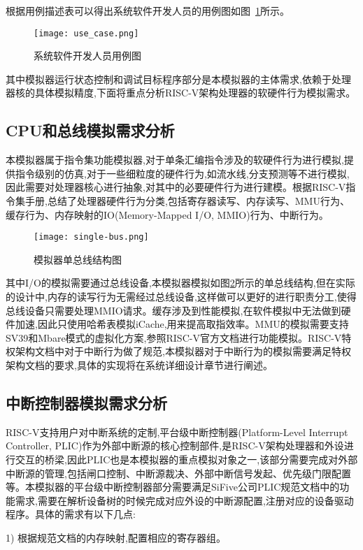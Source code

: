 根据用例描述表可以得出系统软件开发人员的用例图如图~\ref{fig:use-case}所示。
\begin{figure}[H]
  \centering
  \texttt{[image: use\_case.png]}
  \caption{系统软件开发人员用例图}
  \label{fig:use-case}
\end{figure}


其中模拟器运行状态控制和调试目标程序部分是本模拟器的主体需求,依赖于处理器核的具体模拟精度,下面将重点分析RISC-V架构处理器的软硬件行为模拟需求。

\subsection{CPU和总线模拟需求分析}
本模拟器属于指令集功能模拟器,对于单条汇编指令涉及的软硬件行为进行模拟,提供指令级别的仿真,对于一些细粒度的硬件行为,如流水线,分支预测等不进行模拟,因此需要对处理器核心进行抽象,对其中的必要硬件行为进行建模。根据RISC-V指令集手册,总结了处理器硬件行为分类,包括寄存器读写、内存读写、MMU行为、缓存行为、内存映射的IO(Memory-Mapped I/O, MMIO)行为、中断行为。
\begin{figure}[H]
  \centering
  \texttt{[image: single-bus.png]}
  \caption{模拟器单总线结构图}
  \label{fig:single-bus}
\end{figure}

其中I/O的模拟需要通过总线设备,本模拟器模拟如图\ref{fig:single-bus}所示的单总线结构,但在实际的设计中,内存的读写行为无需经过总线设备,这样做可以更好的进行职责分工,使得总线设备只需要处理MMIO请求。缓存涉及到性能模拟,在软件模拟中无法做到硬件加速,因此只使用哈希表模拟iCache,用来提高取指效率。MMU的模拟需要支持SV39和Mbare模式的虚拟化方案,参照RISC-V官方文档进行功能模拟。RISC-V特权架构文档中对于中断行为做了规范,本模拟器对于中断行为的模拟需要满足特权架构文档的要求,具体的实现将在系统详细设计章节进行阐述。

\subsection{中断控制器模拟需求分析}
RISC-V支持用户对中断系统的定制,平台级中断控制器(Platform-Level Interrupt Controller, PLIC)作为外部中断源的核心控制部件,是RISC-V架构处理器和外设进行交互的桥梁,因此PLIC也是本模拟器的重点模拟对象之一,该部分需要完成对外部中断源的管理,包括闸口控制、中断源裁决、外部中断信号发起、优先级门限配置等。本模拟器的平台级中断控制器部分需要满足SiFive公司PLIC规范文档中的功能需求,需要在解析设备树的时候完成对应外设的中断源配置,注册对应的设备驱动程序。具体的需求有以下几点:


1) 根据规范文档的内存映射,配置相应的寄存器组。


